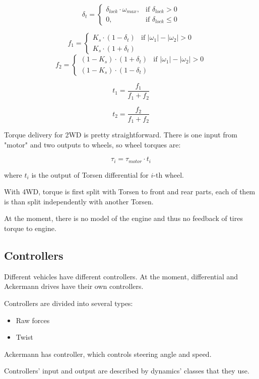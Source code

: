 \documentclass[a4paper,11pt]{article}
\begin{document}
$$
\delta_t = 
\begin{cases}
	\delta_{lock} \cdot \omega_{max}, & \mbox{if } \delta_{lock} >  0 \\
	0, & \mbox{if } \delta_{lock} \leq 0
\end{cases}
$$

$$
f_1 = 
\begin{cases}
	K_s \cdot (1 - \delta_t) & \mbox{if } |\omega_1| - |\omega_2| > 0 \\
	K_s \cdot (1 + \delta_t)
\end{cases}
$$
$$
f_2 = 
\begin{cases}
	(1 - K_s) \cdot (1 + \delta_t) & \mbox{if } |\omega_1| - |\omega_2| > 0 \\
	(1 - K_s) \cdot (1 - \delta_t)
\end{cases}
$$

$$
t_1 = \frac{f_1}{f_1 + f_2}
$$

$$
t_2 = \frac{f_2}{f_1 + f_2}
$$

Torque delivery for 2WD is pretty straightforward. There is one input from "motor" and two outputs to wheels, so wheel torques are:

$$
\tau_i = \tau_{motor} \cdot t_i
$$

where $t_i$ is the output of Torsen differential for $i$-th wheel.

With 4WD, torque is first split with Torsen to front and rear parts, each of them is than split independently with another Torsen.

At the moment, there is no model of the engine and thus no feedback of tires torque to engine. 


\subsection{Controllers} \label{sec:controllers}

Different vehicles have different controllers. 
At the moment, differential and Ackermann drives have their own controllers. 

Controllers are divided into several types: 
\begin{itemize}
\item Raw forces
\item Twist
\end{itemize}

Ackermann has controller, which controls steering angle and speed. 

Controllers' input and output are described by dynamics' classes that they use. 
\end{document}
